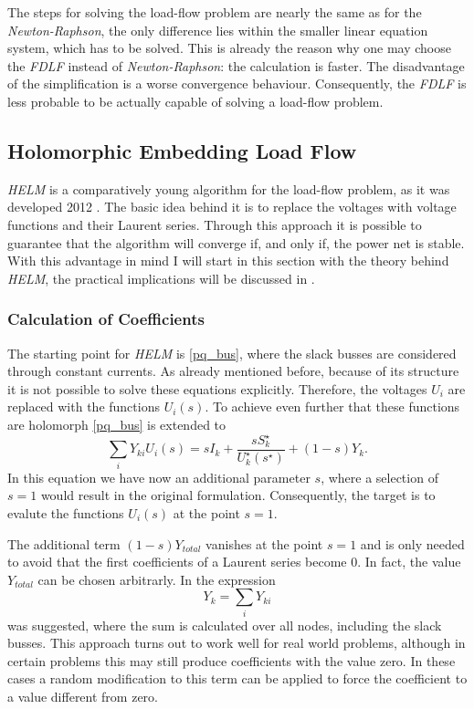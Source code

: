 The steps for solving the load-flow problem are nearly the same as for the \emph{Newton-Raphson}, the only difference lies within the smaller linear equation system, which has to be solved. This is already the reason why one may choose the \emph{FDLF} instead of \emph{Newton-Raphson}: the calculation is faster. The disadvantage of the simplification is a worse convergence behaviour. Consequently, the \emph{FDLF} is less probable to be actually capable of solving a load-flow problem.

\subsection{Holomorphic Embedding Load Flow}
\label{sec:helm}

\emph{HELM} is a comparatively young algorithm for the load-flow problem, as it was developed 2012 \citep{helmIEEE}. The basic idea behind it is to replace the voltages with voltage functions and their Laurent series. Through this approach it is possible to guarantee that the algorithm will converge if, and only if, the power net is stable. With this advantage in mind I will start in this section with the theory behind \emph{HELM}, the practical implications will be discussed in .

\subsubsection{Calculation of Coefficients}

The starting point for \emph{HELM} is \eqref{pq_bus}, where the slack busses are considered through constant currents. As already mentioned before, because of its structure it is not possible to solve these equations explicitly. Therefore, the voltages $U_i$ are replaced with the functions $U_i(s)$. To achieve even further that these functions are holomorph \citep{helmPatentSept2009} \eqref{pq_bus} is extended to
\begin{equation}	
		\sum_i Y_{ki} U_{i}(s) = s I_k + \frac{s S_k^\star}{U_k^\star(s^\star)} + (1 - s) Y_k.
		\label{eq:pq_bus_embedded}
\end{equation}
In this equation we have now an additional parameter $s$, where a selection of $s = 1$ would result in the original formulation. Consequently, the target is to evalute the functions $U_i(s)$ at the point $s = 1$.

The additional term $(1 - s) Y_{total}$ vanishes at the point $s = 1$ and is only needed to avoid that the first coefficients of a Laurent series become 0. In fact, the value $Y_{total}$ can be chosen arbitrarly. In \citep{helmPatentSept2009} the expression
\begin{equation}
	Y_k = \sum_i Y_{ki}
\end{equation}
was suggested, where the sum is calculated over all nodes, including the slack busses. This approach turns out to work well for real world problems, although in certain problems this may still produce coefficients with the value zero. In these cases a random modification to this term can be applied to force the coefficient to a value different from zero.

